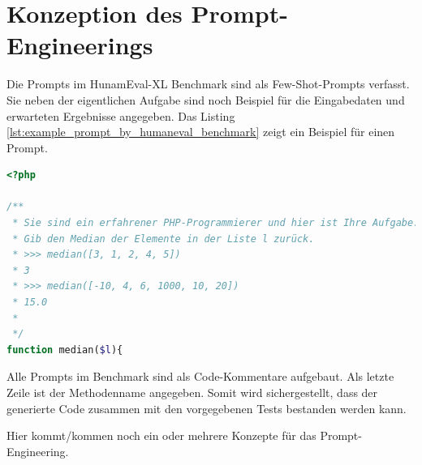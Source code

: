 

\section{Konzeption des Prompt-Engineerings}
Die Prompts im HunamEval-XL Benchmark sind als Few-Shot-Prompts verfasst. Sie neben der eigentlichen Aufgabe sind noch Beispiel für die Eingabedaten und erwarteten Ergebnisse angegeben. Das Listing \ref{lst:example_prompt_by_humaneval_benchmark} zeigt ein Beispiel für einen Prompt.

\begin{lstlisting}[language=php,caption={Prompt Beispiel für  eine Aufgabe aus dem HumanEval-XL Benchmark},label=lst:example_prompt_by_humaneval_benchmark]
<?php

/**
 * Sie sind ein erfahrener PHP-Programmierer und hier ist Ihre Aufgabe.
 * Gib den Median der Elemente in der Liste l zurück.
 * >>> median([3, 1, 2, 4, 5])
 * 3
 * >>> median([-10, 4, 6, 1000, 10, 20])
 * 15.0
 *
 */
function median($l){
\end{lstlisting}

Alle Prompts im Benchmark sind als Code-Kommentare aufgebaut. Als letzte Zeile ist der Methodenname angegeben. Somit wird sichergestellt, dass der generierte Code zusammen mit den vorgegebenen Tests bestanden werden kann.\vspace{0.2cm}

\begin{tcolorbox}[
	enhanced,
	colback=red!5!white,
	colframe=red!75!black!50,
	title= Mein roter Faden
	]
	Hier kommt/kommen noch ein oder mehrere Konzepte für das Prompt-Engineering.
\end{tcolorbox}






